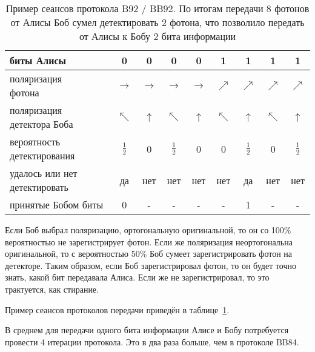 \begin{table}
    \centering
    \begin{tabular}{|l|c|c|c|c|c|c|c|c|}
        \hline
        \parbox[c][1cm][c]{2,8cm}{биты Алисы} & 0 & 0 & 0 & 0 & 1 & 1 & 1 & 1 \\
        \hline
        \parbox[c][1cm][c]{2,8cm}{поляризация \\ фотона} & $\to$ & $\to$ & $\to$ & $\to$ & $\nearrow$ & $\nearrow$ & $\nearrow$ & $\nearrow$ \\
        \hline
        \parbox[c][1cm][c]{2,8cm}{поляризация \\ детектора Боба} & $\nwarrow$ & $\uparrow$ & $\nwarrow$ & $\uparrow$ & $\nwarrow$ & $\uparrow$ & $\nwarrow$ & $\uparrow$ \\
        \hline
        \parbox[c][1cm][c]{2,8cm}{вероятность \\ детектирования} & $\frac{1}{2}$ & 0 & $\frac{1}{2}$ & 0 & 0 & $\frac{1}{2}$ & 0 & $\frac{1}{2}$ \\
        \hline
        \parbox[c][1cm][c]{2,8cm}{удалось или нет детектировать} & да & нет & нет & нет & нет & да & нет &  нет \\
        \hline
        \parbox[c][1cm][c]{2,8cm}{принятые Бобом биты} & 0 & - & - & - & - & 1 & - & - \\
        \hline
    \end{tabular}
    \caption{Пример сеансов протокола B92 / BB92. По итогам передачи 8 фотонов от Алисы Боб сумел детектировать 2 фотона, что позволило передать от Алисы к Бобу 2 бита информации}
    \label{tab:b92}
\end{table}

Если Боб выбрал поляризацию, ортогональную оригинальной, то он со 100\% вероятностью не зарегистрирует фотон. Если же поляризация неортогональна оригинальной, то с вероятностью 50\% Боб сумеет зарегистрировать фотон на детекторе. Таким образом, если Боб зарегистрировал фотон, то он будет точно знать, какой бит передавала Алиса. Если же не зарегистрировал, то это трактуется, как стирание.

Пример сеансов протоколов передачи приведён в таблице~\ref{tab:b92}.

В среднем для передачи одного бита информации Алисе и Бобу потребуется провести 4 итерации протокола. Это в два раза больше, чем в протоколе BB84.

